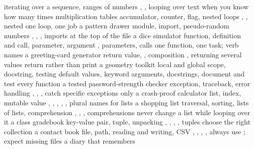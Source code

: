   {iterating over a sequence, ranges of numbers}
  {, , looping over text}
  { when you know how many times}
  {multiplication tables}
  {accumulator, counter, flag, nested loops}
  {, , nested }
  {one loop, one job}
  {a pattern drawer}
  {module, import, pseudo-random numbers}
  {, , , }
  {imports at the top of the file}
  {a dice simulator}
  {function, definition and call, parameter, argument}
  {, parameters, calls}
  {one function, one task; verb names}
  {a greeting-card generator}
  {return value, , composition}
  {, returning several values}
  {return rather than print}
  {a geometry toolkit}
  {local and global scope, docstring, testing}
  {default values, keyword arguments, docstrings, }
  {document and test every function}
  {a tested password-strength checker}
  {exception, traceback, error handling}
  {, , , }
  {catch specific exceptions only}
  {a crash-proof calculator}
  {list, index, mutable value}
  {\py{[ ]}, , , , , }
  {plural names for lists}
  {a shopping list}
  {traversal, sorting, lists of lists, comprehension}
  {, , , comprehensions}
  {never change a list while looping over it}
  {a class gradebook}
  {key-value pair, tuple, unpacking}
  {\py{\{ \}}, , , , tuples}
  {choose the right collection}
  {a contact book}
  {file, path, reading and writing, CSV}
  {, , , , }
  {always use ; expect missing files}
  {a diary that remembers}

